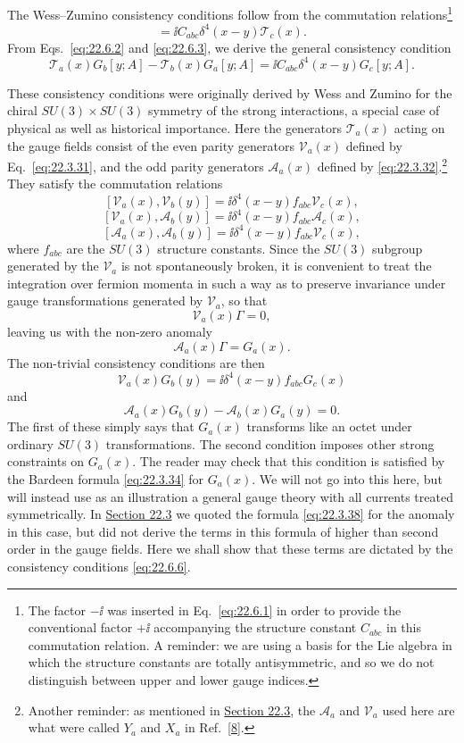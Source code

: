 The Wess--Zumino consistency conditions follow from the commutation
relations\footnote{The factor $-\ii$ was inserted in
Eq.~\eqref{eq:22.6.1} in order to provide the conventional factor $+\ii$
accompanying the structure constant $C_{abc}$ in this
commutation relation. A reminder: we are using a basis for the Lie algebra
in which the structure constants are totally antisymmetric, and so we do
not distinguish between upper and lower gauge indices.}
\begin{equation}
 [\mathcal T_a(x),\mathcal T_b(y)]
 =\ii C_{abc}\delta^4(x-y)\mathcal T_c(x).
 \tag{22.6.5}\label{eq:22.6.5}
\end{equation}
From Eqs.~\eqref{eq:22.6.2} and \eqref{eq:22.6.3}, we derive the general
consistency condition
\begin{equation}
 \mathcal T_a(x)G_b[y;A]
 -\mathcal T_b(x)G_a[y;A]
 =\ii C_{abc}\delta^4(x-y)G_c[y;A].
 \tag{22.6.6}\label{eq:22.6.6}
\end{equation}

These consistency conditions were originally derived by Wess and Zumino
for the chiral $SU(3)\times SU(3)$ symmetry of the strong interactions, a
special case of physical as well as historical importance. Here the
generators $\mathcal T_a(x)$ acting on the gauge fields consist of the
even parity generators $\mathcal V_a(x)$ defined by
Eq.~\eqref{eq:22.3.31}, and the odd parity generators $\mathcal A_a(x)$
defined by \eqref{eq:22.3.32}.\footnote{Another reminder: as mentioned in
\hyperref[sec:22.3]{Section 22.3}, the $\mathcal A_a$ and $\mathcal V_a$
used here are what were called $Y_a$ and $X_a$ in
Ref.~\hyperref[ch22-ref-8]{[8]}.} They satisfy the commutation relations
\[
 [\mathcal V_a(x),\mathcal V_b(y)]
 =\ii\delta^4(x-y)f_{abc}\mathcal V_c(x),
\]
\[
 [\mathcal V_a(x),\mathcal A_b(y)]
 =\ii\delta^4(x-y)f_{abc}\mathcal A_c(x),
\]
\[
 [\mathcal A_a(x),\mathcal A_b(y)]
 =\ii\delta^4(x-y)f_{abc}\mathcal V_c(x),
\]
where $f_{abc}$ are the $SU(3)$ structure constants. Since the $SU(3)$
subgroup generated by the $\mathcal V_a$ is not spontaneously broken, it
is convenient to treat the integration over fermion momenta in such a way
as to preserve invariance under gauge transformations generated by
$\mathcal V_a$, so that
\[
 \mathcal V_a(x)\Gamma=0,
\]
leaving us with the non-zero anomaly
\[
 \mathcal A_a(x)\Gamma=G_a(x).
\]
The non-trivial consistency conditions are then
\[
 \mathcal V_a(x)G_b(y)
 =\ii\delta^4(x-y)f_{abc}G_c(x)
\]
and
\[
 \mathcal A_a(x)G_b(y)-\mathcal A_b(x)G_a(y)=0.
\]
The first of these simply says that $G_a(x)$ transforms like an octet
under ordinary $SU(3)$ transformations. The second condition imposes
other strong constraints on $G_a(x)$. The reader may check that this
condition is satisfied by the Bardeen formula \eqref{eq:22.3.34} for
$G_a(x)$. We will not go into this here, but will instead use as an
illustration a general gauge theory with all currents treated symmetrically.
In \hyperref[sec:22.3]{Section 22.3} we quoted the formula
\eqref{eq:22.3.38} for the anomaly in this case, but did not derive the
terms in this formula of higher than second order in the gauge fields. Here
we shall show that these terms are dictated by the consistency conditions
\eqref{eq:22.6.6}.

